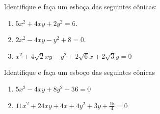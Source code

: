 \begin{frame}[label=conicas]
\begin{exe}
Identifique e faça um esboça das seguintes cônicas:
\begin{enumerate}
\item $5x^2+4xy+2y^2=6$.
\item $2x^2-4xy-y^2+8=0.$
\item $x^2+4\sqrt{2}xy-y^2+2\sqrt{6}x+2\sqrt{3}y=0$
\end{enumerate}
\end{exe}
\end{frame}


\begin{frame}[label=conicas]
\begin{casa}
Identifique e faça um esboço das seguintes cônicas

\begin{enumerate}
\item  $5x^2-4xy+8y^2-36=0$
\item $11 x^{2} + 24 x y + 4 x + 4 y^{2} + 3 y + \frac{15}{4} = 0$
\end{enumerate}
\end{casa}
\end{frame}

\begin{frame}[label=conicas]



\end{frame}